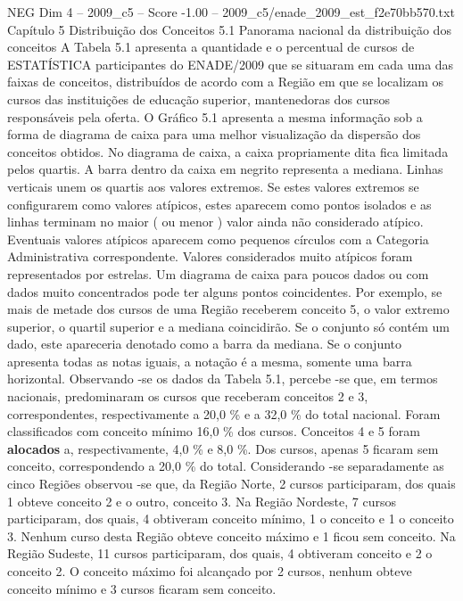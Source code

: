 \begin{textsample}{NEG Dim 4 – 2009\_c5 – Score -1.00 – 2009\_c5/enade\_2009\_est\_f2e70bb570.txt}  \label{ex:f4_neg_087}
Capítulo 5 Distribuição dos Conceitos 5.1 Panorama nacional da distribuição dos conceitos A Tabela 5.1 apresenta a quantidade e o percentual de cursos de ESTATÍSTICA participantes do ENADE/2009 que se situaram em cada uma das faixas de conceitos, distribuídos de acordo com a Região em que se localizam os cursos das instituições de educação superior, mantenedoras dos cursos responsáveis pela oferta.
O Gráfico 5.1 apresenta a mesma informação sob a forma de diagrama de caixa para uma melhor visualização da dispersão dos conceitos obtidos.
No diagrama de caixa, a caixa propriamente dita fica limitada pelos quartis.
A barra dentro da caixa em negrito representa a mediana.
Linhas verticais unem os quartis aos valores extremos.
Se estes valores extremos se configurarem como valores atípicos, estes aparecem como pontos isolados e as linhas terminam no maior ( ou menor ) valor ainda não considerado atípico.
Eventuais valores atípicos aparecem como pequenos círculos com a Categoria Administrativa correspondente.
Valores considerados muito atípicos foram representados por estrelas.
Um diagrama de caixa para poucos dados ou com dados muito concentrados pode ter alguns pontos coincidentes.
Por exemplo, se mais de metade dos cursos de uma Região receberem conceito 5, o valor extremo superior, o quartil superior e a mediana coincidirão.
Se o conjunto só contém um dado, este apareceria denotado como a barra da mediana.
Se o conjunto apresenta todas as notas iguais, a notação é a mesma, somente uma barra horizontal.
Observando -se os dados da Tabela 5.1, percebe -se que, em termos nacionais, predominaram os cursos que receberam conceitos 2 e 3, correspondentes, respectivamente a 20,0 \% e a 32,0 \% do total nacional.
Foram classificados com conceito mínimo 16,0 \% dos cursos.
Conceitos 4 e 5 foram \textbf{alocados} a, respectivamente, 4,0 \% e 8,0 \%.
Dos cursos, apenas 5 ficaram sem conceito, correspondendo a 20,0 \% do total.
Considerando -se separadamente as cinco Regiões observou -se que, da Região Norte, 2 cursos participaram, dos quais 1 obteve conceito 2 e o outro, conceito 3.
Na Região Nordeste, 7 cursos participaram, dos quais, 4 obtiveram conceito mínimo, 1 o conceito e 1 o conceito 3.
Nenhum curso desta Região obteve conceito máximo e 1 ficou sem conceito.
Na Região Sudeste, 11 cursos participaram, dos quais, 4 obtiveram conceito e 2 o conceito 2.
O conceito máximo foi alcançado por 2 cursos, nenhum obteve conceito mínimo e 3 cursos ficaram sem conceito.

\end{textsample}
